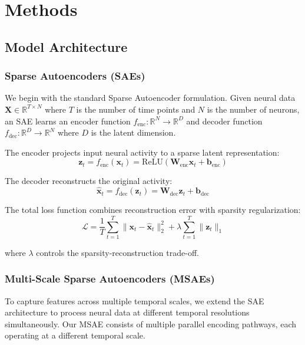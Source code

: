 \section{Methods}

\subsection{Model Architecture}

\subsubsection{Sparse Autoencoders (SAEs)}

We begin with the standard Sparse Autoencoder formulation. Given neural data $\mathbf{X} \in \mathbb{R}^{T \times N}$ where $T$ is the number of time points and $N$ is the number of neurons, an SAE learns an encoder function $f_{\text{enc}}: \mathbb{R}^N \rightarrow \mathbb{R}^D$ and decoder function $f_{\text{dec}}: \mathbb{R}^D \rightarrow \mathbb{R}^N$ where $D$ is the latent dimension.

The encoder projects input neural activity to a sparse latent representation:
\begin{equation}
\mathbf{z}_t = f_{\text{enc}}(\mathbf{x}_t) = \text{ReLU}(\mathbf{W}_{\text{enc}} \mathbf{x}_t + \mathbf{b}_{\text{enc}})
\end{equation}

The decoder reconstructs the original activity:
\begin{equation}
\hat{\mathbf{x}}_t = f_{\text{dec}}(\mathbf{z}_t) = \mathbf{W}_{\text{dec}} \mathbf{z}_t + \mathbf{b}_{\text{dec}}
\end{equation}

The total loss function combines reconstruction error with sparsity regularization:
\begin{equation}
\mathcal{L} = \frac{1}{T} \sum_{t=1}^{T} \|\mathbf{x}_t - \hat{\mathbf{x}}_t\|_2^2 + \lambda \sum_{t=1}^{T} \|\mathbf{z}_t\|_1
\end{equation}

where $\lambda$ controls the sparsity-reconstruction trade-off.

\subsubsection{Multi-Scale Sparse Autoencoders (MSAEs)}

To capture features across multiple temporal scales, we extend the SAE architecture to process neural data at different temporal resolutions simultaneously. Our MSAE consists of multiple parallel encoding pathways, each operating at a different temporal scale.

